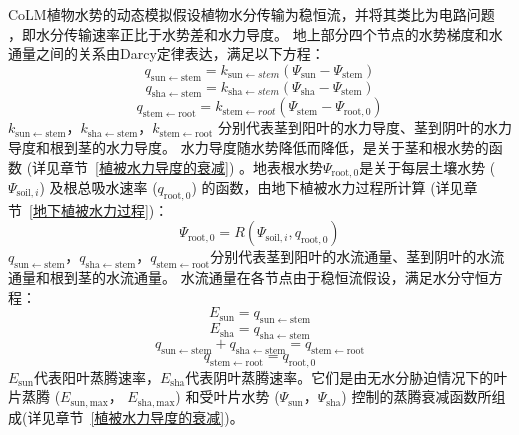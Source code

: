 CoLM植物水势的动态模拟假设植物水分传输为稳恒流，并将其类比为电路问题~
\citep{van1948water}，即水分传输速率正比于水势差和水力导度。
地上部分四个节点的水势梯度和水通量之间的关系由Darcy定律表达，满足以下方程：
\begin{equation}\label{q_sunstem}
  q_{\mathrm{ {sun \leftarrow stem }}}=k_{\mathrm{{sun}} \leftarrow  {stem}}\left(\Psi_{\mathrm{sun}}-\Psi_{\mathrm{stem}}\right)
\end{equation}
\begin{equation}
  q_{\mathrm{ {sha \leftarrow stem }}}=k_{\mathrm{ {sha}} \leftarrow {stem}}\left(\Psi_{\mathrm{sha}}-\Psi_{\mathrm{ {stem }}}\right)
\end{equation}
\begin{equation}
  q_{\mathrm{ {stem \leftarrow root }}}=k_{\mathrm{ {stem }} \leftarrow  { root }}\left(\Psi_{\mathrm{ {stem }}}-\Psi_{\mathrm{ {root }}, 0}\right)
\end{equation}
$k_{\mathrm{sun \leftarrow stem}}$，$k_{\mathrm{sha \leftarrow stem }}$，$k_{\mathrm{stem \leftarrow root }}$ 分别代表茎到阳叶的水力导度、茎到阴叶的水力导度和根到茎的水力导度。
水力导度随水势降低而降低，是关于茎和根水势的函数 (详见章节~\ref{植被水力导度的衰减}) 。地表根水势$\Psi_{\mathrm{root,0}}$是关于每层土壤水势 ($\Psi_{\mathrm{soil},i}$) 
及根总吸水速率 ($q_{\mathrm{root,0}}$) 的函数，由地下植被水力过程所计算 (详见章节~\ref{地下植被水力过程})：
\begin{equation}\label{Psi_root_0}
  \Psi_{\mathrm{root, 0}}=R\left(\Psi_{\mathrm{ {soil }}, i}, q_{\mathrm{root, 0}}\right)
\end{equation}
$q_{\mathrm{sun \leftarrow stem}}$，$q_{\mathrm{sha \leftarrow stem }}$，$q_{\mathrm{stem \leftarrow root }}$分别代表茎到阳叶的水流通量、茎到阴叶的水流通量和根到茎的水流通量。
水流通量在各节点由于稳恒流假设，满足水分守恒方程：
\begin{equation}
  E_{\mathrm{sun}}=q_{\mathrm{sun \leftarrow  stem}}
\end{equation}
\begin{equation}
  E_{\mathrm{ {sha }}}=q_{\mathrm{ sha \leftarrow stem}}
\end{equation}
\begin{equation}
  q_{\mathrm{ {sun \leftarrow stem }}}+q_{\mathrm{ {sha \leftarrow stem }}}=q_{\mathrm{ {stem \leftarrow root }}}
\end{equation}
\begin{equation}\label{q_stemroot}
  q_{\mathrm{stem \leftarrow root}}=q_{\mathrm{root, 0}}
\end{equation}
$E_{\mathrm{sun}}$代表阳叶蒸腾速率，$E_{\mathrm{sha}}$代表阴叶蒸腾速率。它们是由无水分胁迫情况下的叶片蒸腾 ($E_{\mathrm{sun,max}}$， $E_{\mathrm{sha,max}}$) 
和受叶片水势 ($\Psi_{\mathrm{sun}}$，$\Psi_{\mathrm{sha}}$) 控制的蒸腾衰减函数所组成(详见章节~\ref{植被水力导度的衰减})。


